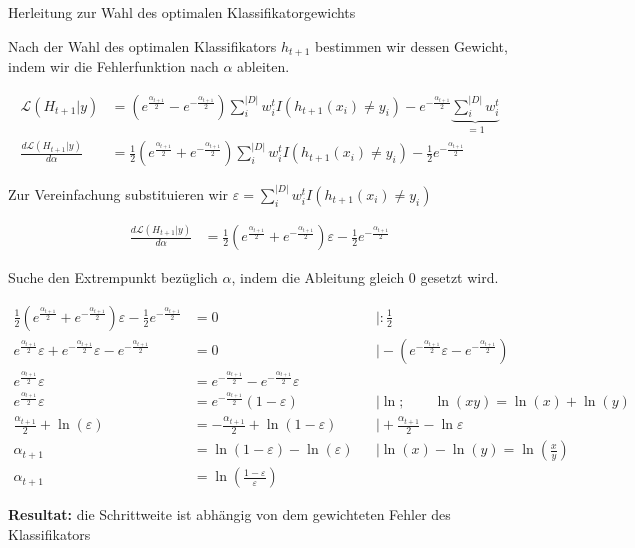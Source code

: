\documentclass[a4paper,12pt]{scrartcl}
\begin{document}
\begin{equationfloat}[!h]
	\caption{Herleitung zur Wahl des optimalen Klassifikatorgewichts}
	
	Nach der Wahl des optimalen Klassifikators $h_{t+1}$ bestimmen wir dessen Gewicht, indem wir die Fehlerfunktion nach $\alpha$ ableiten.
	
	\begin{align*}
		\mathcal{L}(H_{t+1}\vert y) & = (e^{\frac{\alpha_{t+1}}{2}} - e^{-\frac{\alpha_{t+1}}{2}}) \sum_{i}^{\vert D\vert} w_i^t I(h_{t+1}(x_i)\neq y_i) - e^{-\frac{\alpha_{t+1}}{2}}\underbrace{\sum_i^{\vert D\vert} w_i^t}_{=1}
		\\
		\frac{d\mathcal{L}(H_{t+1}\vert y)}{d\alpha}&= \frac{1}{2} (e^{\frac{\alpha_{t+1}}{2}} + e^{-\frac{\alpha_{t+1}}{2}}) \sum_{i}^{\vert D\vert} w_i^t I(h_{t+1}(x_i)\neq y_i) -\frac{1}{2} e^{-\frac{\alpha_{t+1}}{2}}
	\end{align*}
	
	Zur Vereinfachung substituieren wir $\varepsilon = \sum_{i}^{\vert D\vert} w_i^t I(h_{t+1}(x_i)\neq y_i)$
	
	\begin{align*}
		\frac{d\mathcal{L}(H_{t+1}\vert y)}{d\alpha}&= \frac{1}{2} (e^{\frac{\alpha_{t+1}}{2}} + e^{-\frac{\alpha_{t+1}}{2}}) \varepsilon -\frac{1}{2} e^{-\frac{\alpha_{t+1}}{2}}
	\end{align*}
	
	Suche den Extrempunkt bezüglich $\alpha$, indem die Ableitung gleich 0 gesetzt wird. 
	
	\begin{align*}
		\frac{1}{2} (e^{\frac{\alpha_{t+1}}{2}} + e^{-\frac{\alpha_{t+1}}{2}}) \varepsilon -\frac{1}{2} e^{-\frac{\alpha_{t+1}}{2}}
		& = 0
		&& \big\vert :\frac{1}{2}
		\\
		e^{\frac{\alpha_{t+1}}{2}} \varepsilon + e^{-\frac{\alpha_{t+1}}{2}} \varepsilon - e^{-\frac{\alpha_{t+1}}{2}} &= 0 
		&& \big\vert - (e^{-\frac{\alpha_{t+1}}{2}} \varepsilon -e^{-\frac{\alpha_{t+1}}{2}})
		\\
		e^{\frac{\alpha_{t+1}}{2}} \varepsilon
		& =e^{-\frac{\alpha_{t+1}}{2}} - e^{-\frac{\alpha_{t+1}}{2}} \varepsilon
		&&
		\\
		e^{\frac{\alpha_{t+1}}{2}} \varepsilon 
		& =e^{-\frac{\alpha_{t+1}}{2}} (1-\varepsilon) 
		&&  \big\vert\ln; \qquad \ln(xy) = \ln(x) + \ln(y)
		\\
		\frac{\alpha_{t+1}}{2} + \ln\left(\varepsilon\right) 
		& = -\frac{\alpha_{t+1}}{2} + \ln\left(1-\varepsilon\right)
		&& \big\vert + \frac{\alpha_{t+1}}{2} - \ln{\varepsilon}
		\\
		\alpha_{t+1}
		& =\ln(1-\varepsilon) - \ln(\varepsilon) 
		&& \big\vert \ln(x) - \ln(y) = \ln(\frac{x}{y})
		\\
		\alpha_{t+1} 
		& =\ln\left(\frac{1-\varepsilon}{\varepsilon} \right)
	\end{align*}
	
	\textbf{Resultat:} die Schrittweite ist abhängig von dem gewichteten Fehler des Klassifikators
\end{equationfloat}	
\end{document}
